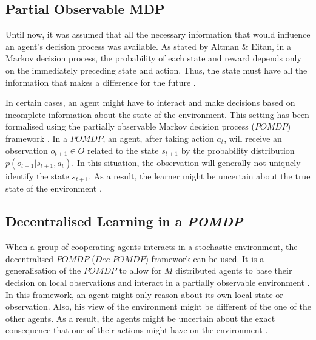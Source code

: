 \subsection{Partial Observable MDP}

Until now, it was assumed that all the necessary information that would influence an agent's decision process was available. As stated by Altman \& Eitan, in a Markov decision process, the probability of each state and reward depends only on the immediately preceding state and action. Thus, the state must have all the information that makes a difference for the future \cite{altman_constrained_1999}.

In certain cases, an agent might have to interact and make decisions based on incomplete information about the state of the environment. This setting has been formalised using the partially observable Markov decision process ($POMDP$) framework \cite{bernstein_complexity_2013}. In a $POMDP$, an agent, after taking action $a_t$, will receive an observation $o_{t+1} \in O$ related to the state $s_{t+1}$ by the probability distribution $p(o_{t+1}|s_{t+1}, a_t)$. In this situation, the observation will generally not uniquely identify the state $s_{t+1}$. As a result, the learner might be uncertain about the true state of the environment \cite{t._j._spaan_decentralized_2006}.


\subsection{Decentralised Learning in a \textit{POMDP}}

When a group of cooperating agents interacts in a stochastic environment, the decentralised $POMDP$ ($Dec$-$POMDP$) framework can be used. It is a generalisation of the $POMDP$ to allow for $M$ distributed agents to base their decision on local observations and interact in a partially observable environment \cite{bernstein_complexity_2013}. In this framework, an agent might only reason about its own local state or observation. Also, his view of the environment might be different of the one of the other agents. As a result, the agents might be uncertain about the exact consequence that one of their actions might have on the environment \cite{t._j._spaan_decentralized_2006}.

